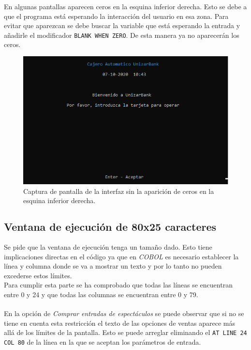 \documentclass[10pt,a4paper]{article}
\begin{document}
En algunas pantallas aparecen ceros en la esquina inferior derecha. Esto se debe a que el programa está esperando la interacción del usuario en esa zona. Para evitar que aparezcan se debe buscar la variable que está esperando la entrada y añadirle el modificador \texttt{BLANK WHEN ZERO}. De esta manera ya no aparecerán los ceros.\\

\begin{figure}[h!]
\centering
\includegraphics[scale=0.75]{images/ceros.png}
\caption{Captura de pantalla de la interfaz sin la aparición de ceros en la esquina inferior derecha.}
\label{fig:error}
\end{figure}

\subsection{Ventana de ejecución de 80x25 caracteres}

Se pide que la ventana de ejecución tenga un tamaño dado. Esto tiene implicaciones directas en el código ya que en \emph{COBOL} es necesario establecer la línea y columna donde se va a mostrar un texto y por lo tanto no pueden excederse estos límites.\\
Para cumplir esta parte se ha comprobado que todas las líneas se encuentran entre 0 y 24 y que todas las columnas se encuentran entre 0 y 79.\\
\\
En la opción de \emph{Comprar entradas de espectáculos} se puede observar que si no se tiene en cuenta esta restricción el texto de las opciones de ventas aparece más allá de los límites de la pantalla. Esto se puede arreglar eliminando el \texttt{AT LINE 24 COL 80} de la línea en la que se aceptan los parámetros de entrada.
\end{document}
